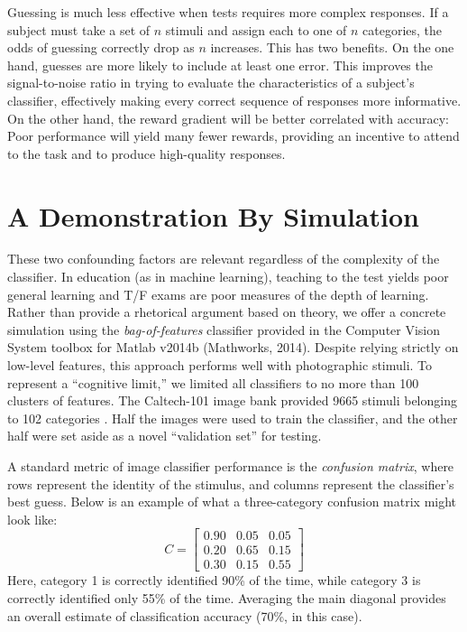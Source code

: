 \documentclass{frontiersSCNS} %
\begin{document}
Guessing is much less effective when tests requires more complex responses. If a subject must take a set of $n$ stimuli and assign each to one of $n$ categories, the odds of guessing correctly drop as $n$ increases. This has two benefits. On the one hand, guesses are more likely to include at least one error. This improves the signal-to-noise ratio in trying to evaluate the characteristics of a subject's classifier, effectively making every correct sequence of responses more informative. On the other hand, the reward gradient will be better correlated with accuracy: Poor performance will yield many fewer rewards, providing an incentive to attend to the task and to produce high-quality responses.

\section{A Demonstration By Simulation}

These two confounding factors are relevant regardless of the complexity of the classifier. In education (as in machine learning), teaching to the test yields poor general learning and T/F exams are poor measures of the depth of learning. Rather than provide a rhetorical argument based on theory, we offer a concrete simulation using the \textsl{bag-of-features} classifier \citep{OHara2011} provided in the Computer Vision System toolbox for Matlab v2014b (Mathworks, 2014). Despite relying strictly on low-level features, this approach performs well with photographic stimuli. To represent a ``cognitive limit,'' we limited all classifiers to no more than 100 clusters of features. The Caltech-101 image bank provided 9665 stimuli belonging to 102 categories \citep{Fei2007}. Half the images were used to train the classifier, and the other half were set aside as a novel ``validation set'' for testing. 

A standard metric of image classifier performance is the \textsl{confusion matrix}, where rows represent the identity of the stimulus, and columns represent the classifier's best guess. Below is an example of what a three-category confusion matrix might look like:
\begin{equation*}
C = \begin{bmatrix}
	0.90	&	0.05	&	0.05 \\
	0.20	&	0.65	&	0.15 \\
	0.30	&	0.15	&	0.55
\end{bmatrix}
\end{equation*}
Here, category 1 is correctly identified 90\% of the time, while category 3 is correctly identified only 55\% of the time. Averaging the main diagonal provides an overall estimate of classification accuracy (70\%, in this case).
\end{document}
